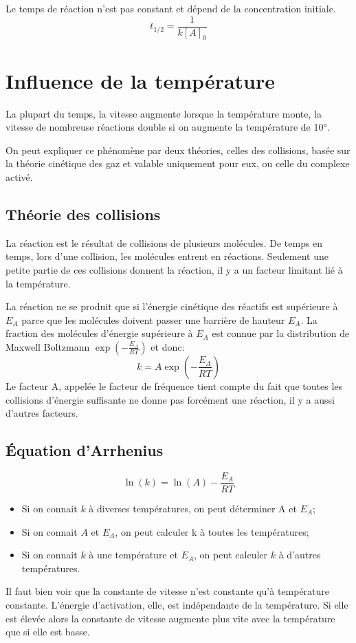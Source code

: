 Le temps de réaction n'est pas constant et dépend de la concentration initiale.
\[ t_{1/2} = \frac 1{k[A]_0} \]

\section{Influence de la température}
La plupart du temps, la vitesse augmente lorsque la température monte,
la vitesse de nombreuse réactions double si on augmente la température de 10°.

On peut expliquer ce phénomène par deux théories,
celles des collisions, basée sur la théorie cinétique des gaz et
valable uniquement pour eux, ou celle du complexe activé.

\subsection{Théorie des collisions}
La réaction est le résultat de collisions de plusieurs molécules.
De temps en temps, lors d'une collision, les molécules entrent en réactions.
Seulement une petite partie de ces collisions donnent la réaction,
il y a un facteur limitant lié à la température.

La réaction ne se produit que si l'énergie cinétique des réactifs est
supérieure à $E_A$ parce que les molécules
doivent passer une barrière de hauteur $E_A$.
La fraction des molécules d'énergie supérieure à
$E_A$ est connue par la distribution de Maxwell Boltzmann
$\exp \left(-\frac{E_A}{RT}\right)$ et donc:
\[ k = A \exp \left(-\frac{E_A}{RT}\right) \]
Le facteur A, appelée le facteur de fréquence tient compte du fait
que toutes les collisions d'énergie suffisante ne donne pas
forcément une réaction, il y a aussi d'autres facteurs.

\subsection{Équation d'Arrhenius}
\[ \ln(k) = \ln(A)-\frac{E_A}{RT} \]
\begin{itemize}
  \item Si on connait $k$ à diverses températures,
    on peut déterminer A et $E_A$;
  \item Si on connait $A$ et $E_A$,
    on peut calculer k à toutes les températures;
  \item Si on connait $k$ à une température et $E_A$,
    on peut calculer $k$ à d'autres températures.
\end{itemize}
Il faut bien voir que la constante de vitesse
n'est constante qu'à température constante.
L'énergie d'activation, elle, est indépendante de la température.
Si elle est élevée alors la constante de vitesse augmente
plus vite avec la température que si elle est basse.


